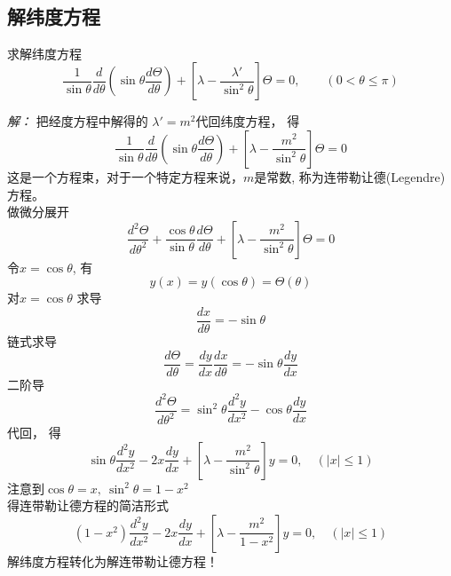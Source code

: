 	~~\\ 
	
	\subsection{解纬度方程}
	
	\begin{example}
		求解纬度方程
		\begin{equation*}
			\frac{1}{\sin \theta} \frac{d}{d \theta}\left(\sin \theta \frac{d \Theta}{d \theta}\right)+\left[\lambda-\frac{\lambda'}{\sin ^{2} \theta}\right] \Theta=0,\qquad (0<\theta \le \pi)
		\end{equation*}		
	\end{example}
	\emph{解：}
		把经度方程中解得的 $\lambda'=m^2$代回纬度方程， 得
		\begin{equation}
			\frac{1}{\sin \theta} \frac{d}{d \theta}\left(\sin \theta \frac{d \Theta}{d \theta}\right)+\left[\lambda-\frac{m^{2}}{\sin ^{2} \theta}\right] \Theta=0
		\end{equation}	
		这是一个方程束，对于一个特定方程来说，$m$是常数, 称为连带勒让德(Legendre)方程。\\
		做微分展开
		\begin{equation*}
			\frac{d^{2} \Theta}{d \theta^{2}}+\frac{\cos \theta}{\sin \theta} \frac{d \Theta}{d \theta}+\left[\lambda-\frac{m^{2}}{\sin ^{2} \theta}\right] \Theta=0
		\end{equation*}		
		令$x=\cos \theta$, 有 $$y(x)= y(\cos \theta) =\Theta (\theta)$$ 
		对$x=\cos \theta$ 求导
		\begin{equation*}
			\frac{d x}{d  \theta} =-\sin \theta  
		\end{equation*}	
		链式求导	
		\begin{equation*}
			\frac{d \Theta}{d \theta} =\frac{d y}{d x}\frac{d x}{d \theta} =-\sin \theta \frac{d y}{d x}
		\end{equation*}	
		二阶导	
		\begin{equation*}
			\frac{ d^2 \Theta }{d \theta ^2} =\sin ^2 \theta \frac{d^2 y}{d x^2} -\cos \theta \frac{d y}{d x}
		\end{equation*}		
		代回， 得
		\begin{equation*}
			\sin  \theta\frac{d^{2} y}{d x^{2}}-2 x \frac{d y}{d x}+\left[\lambda-\frac{m^{2}}{\sin^2 \theta}\right] y=0, \quad (|x|\le 1)
		\end{equation*}	
		注意到$\cos\theta =x,~ \sin^2  \theta =1-x^2 $ \\
		得连带勒让德方程的简洁形式
		\begin{equation}
			\boxed{\left(1-x^{2}\right) \frac{d^{2} y}{d x^{2}}-2 x \frac{d y}{d x}+\left[\lambda-\frac{m^{2}}{1-x^{2}}\right] y=0, \quad (|x|\le 1)} 
		\end{equation}
		解纬度方程转化为解连带勒让德方程！ 
		
